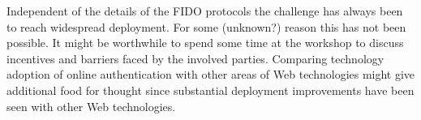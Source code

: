 \documentclass[peerreview, a4paper, 7pt]{IEEEtran}
\begin{document}
Independent of the details of the FIDO protocols the challenge has always been to reach widespread deployment. For some (unknown?) reason this has not been possible. It might be worthwhile to spend some time at the workshop to discuss incentives and barriers faced by the involved parties. Comparing technology adoption of online authentication with other areas of Web technologies might give additional food for thought since substantial deployment improvements have been seen with other Web technologies. 

%

% 

\end{document}
